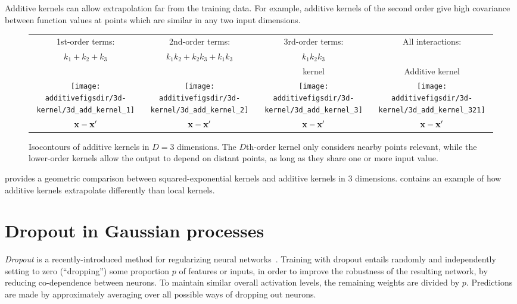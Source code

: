 Additive kernels can allow extrapolation far from the training data.
For example, additive kernels of the second order give high covariance between function values at points which are similar in any two input dimensions.

\begin{figure}[ht!]
\centering
\renewcommand{\tabcolsep}{0pt}
\begin{tabular}{cccc}
1st-order terms: & 2nd-order terms: &  3rd-order terms: & All interactions: \\
$k_1 + k_2 + k_3$ & $k_1k_2 + k_2k_3 + k_1k_3$ & $k_1k_2k_3$ & \\
& & \seard{} kernel & Additive kernel\\
\texttt{[image: \\additivefigsdir/3d-kernel/3d\_add\_kernel\_1]} &
\texttt{[image: \\additivefigsdir/3d-kernel/3d\_add\_kernel\_2]} &
\texttt{[image: \\additivefigsdir/3d-kernel/3d\_add\_kernel\_3]} & 
\texttt{[image: \\additivefigsdir/3d-kernel/3d\_add\_kernel\_321]}\\
${\bf{x}} - {\bf{x}}'$ & ${\bf{x}} - {\bf{x}}'$ & ${\bf{x}} - {\bf{x}}'$ & ${\bf{x}} - {\bf{x}}'$\\[0.5em]
\end{tabular}
\caption[Isocontours of additive kernels in 3 dimensions]
{Isocontours of additive kernels in $D = 3$ dimensions.
The $D$th-order kernel only considers nearby points relevant, while the lower-order kernels allow the output to depend on distant points, as long as they share one or more input value.}
\label{fig:kernels3d}
\end{figure}


 provides a geometric comparison between squared-exponential kernels and additive kernels in 3 dimensions.
 contains an example of how additive kernels extrapolate differently than local kernels.




\section{Dropout in Gaussian processes}
\label{sec:dropout-gps}

\emph{Dropout} is a recently-introduced method for regularizing neural networks~\citep{hinton2012improving, srivastava2013improving}.
Training with dropout entails randomly and independently setting to zero (``dropping'') some proportion $p$ of features or inputs, in order to improve the robustness of the resulting network, by reducing co-dependence between neurons.
To maintain similar overall activation levels, the remaining weights are divided by $p$.
Predictions are made by approximately averaging over all possible ways of dropping out neurons.

